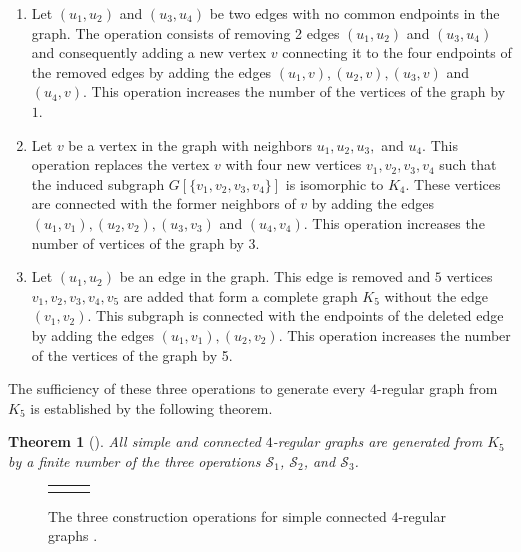 \documentclass{article}
\newtheorem{theorem}{Theorem}
\newcommand{\SI}{
\begin{tikzpicture}
    \node[cvertex] (u1) at (-0.65, 0.5) {}; \node[above=0.15cm]      at (u1) {$u_1$};
    \node[cvertex] (u2) at (0.65, 0.5) {};\node[above=0.15cm]      at (u2) {$u_2$};
    \node[cvertex] (u3) at (-0.65, -0.5) {}; \node[below=0.15cm]      at (u3) {$u_3$};
    \node[cvertex] (u4) at (0.65, -0.5) {};\node[below=0.15cm]      at (u4) {$u_4$};
    
    \draw[redge] (u1) to (u2);
    \draw[redge] (u3) to (u4);
    \draw[gray!60,densely dashed] (0,0) circle (1.3cm);

    \draw[very thick,->] (0,-1.5) -- node[right=0.1cm] {$\mathcal{S}_1$} (0,-2.5);

    \begin{scope}[yshift=-4.3cm]
        \node[cvertex] (u1) at (-0.8, 0.5) {};\node[above=0.15cm]      at (u1) {$u_1$};
        \node[cvertex] (u2) at (0.8, 0.5) {};\node[above=0.15cm]      at (u2) {$u_2$};
        \node[cvertex] (u3) at (-0.8, -0.5) {}; \node[below=0.15cm]      at (u3) {$u_3$};
        \node[cvertex] (u4) at (0.8, -0.5) {}; \node[below=0.15cm]      at (u4) {$u_4$};
        \node[ovvertex] (v) at (0, 0) {}; \node[above=0.15cm]      at (v) {$v$};
        
        \draw[gray!60,densely dashed] (0,0) circle (1.65cm);
        \draw[bedge] (u1) to (v);
        \draw[bedge] (u2) to (v);
        \draw[bedge] (u3) to (v);
        \draw[bedge] (u4) to (v);
    \end{scope}
\end{tikzpicture}
}
\newcommand{\SII}{
\begin{tikzpicture}
    \node[gvertex] (v) at (0, 0) {}; \node[above=0.15cm]      at (v) {$v$};
    \node[cvertex] (u1) at (-0.6, 0.6) {}; \node[above=0.15cm]      at (u1) {$u_1$};
    \node[cvertex] (u2) at (0.6, 0.6) {}; \node[above=0.15cm]      at (u2) {$u_2$};
    \node[cvertex] (u3) at (-0.6, -0.6) {}; \node[below=0.15cm]      at (u3) {$u_3$};
    \node[cvertex] (u4) at (0.6, -0.6) {};  \node[below=0.15cm]      at (u4) {$u_4$};
    
    \draw[redge] (v) to (u1);
    \draw[redge] (v) to (u2);
    \draw[redge] (v) to (u3);
    \draw[redge] (v) to (u4);
    
    \draw[gray!60,densely dashed] (0,0) circle (1.3cm);

    \draw[very thick,->] (0,-1.5) -- node[right=0.1cm] {$\mathcal{S}_2$} (0,-2.5);

    \begin{scope}[yshift=-4.3cm]
        \node[cvertex] (u1) at (-0.85, 0.85) {}; \node[above=0.15cm]      at (u1) {$u_1$};
        \node[cvertex] (u2) at (0.85, 0.85) {}; \node[above=0.15cm]      at (u2) {$u_2$};
        \node[cvertex] (u3) at (-0.85, -0.85) {};  \node[below=0.15cm]      at (u3) {$u_3$};
        \node[cvertex] (u4) at (0.85, -0.85) {};  \node[below=0.15cm]      at (u4) {$u_4$};
        
        \node[ovvertex] (v1) at (-0.35, 0.35) {}; \node[above =0.1cm]      at (v1) {$v_1$};
        \node[ovvertex] (v2) at (0.35, 0.35) {}; \node[above =0.1cm]      at (v2) {$v_2$};
        \node[ovvertex] (v3) at (-0.35, -0.35) {}; \node[below =0.1cm]      at (v3) {$v_3$};
        \node[ovvertex] (v4) at (0.35, -0.35) {}; \node[below =0.1cm]      at (v4) {$v_4$};
        
        \draw[gray!60,densely dashed] (0,0) circle (1.65cm);
        
        \draw[ovedge] (v1) to (v2);
        \draw[ovedge] (v1) to (v3);
        \draw[ovedge] (v1) to (v4);
        \draw[ovedge] (v2) to (v3);
        \draw[ovedge] (v2) to (v4);
        \draw[ovedge] (v3) to (v4);
        
        \draw[bedge] (u1) to (v1);
        \draw[bedge] (u2) to (v2);
        \draw[bedge] (u3) to (v3);
        \draw[bedge] (u4) to (v4);
    \end{scope}
\end{tikzpicture}
}
\newcommand{\SIII}{
\begin{tikzpicture}
    \node[cvertex] (u1) at (-0.6, 0) {}; \node[above=0.15cm]      at (u1) {$u_1$};
    \node[cvertex] (u2) at (0.6, 0) {};  \node[above=0.15cm]      at (u2) {$u_2$};
    
    \draw[redge] (u1) to (u2);
    \draw[gray!60,densely dashed] (0,0) circle (1.3cm);

   \draw[very thick,->] (0,-1.5) -- node[right=0.1cm] {$\mathcal{S}_3$} (0,-2.5);

    \begin{scope}[yshift=-4.3cm]
        \node[cvertex] (u1) at (-1.3, 0) {}; \node[above=0.15cm]      at (u1) {$u_1$};
        \node[cvertex] (u2) at (1.3, 0) {}; \node[above=0.15cm]      at (u2) {$u_2$};
        
        \node[ovvertex] (v1) at (-0.6, 0) {}; \node[above=0.1cm]      at (v1) {$v_1$};
        \node[ovvertex] (v2) at (0.6, 0) {}; \node[above=0.1cm]      at (v2) {$v_2$};
        \node[ovvertex] (v3) at (0, 0.75) {}; \node[above=0.15cm]      at (v3) {$v_3$};
        \node[ovvertex] (v4) at (-0.4, -0.6) {}; \node[below=0.15cm]      at (v4) {$v_4$};
        \node[ovvertex] (v5) at (0.4, -0.6) {}; \node[below=0.15cm]      at (v5) {$v_5$};

        \draw[gray!60,densely dashed] (0,0) circle (1.65cm);

        \draw[ovedge] (v3) to (v1); \draw[ovedge] (v3) to (v2);
        \draw[ovedge] (v3) to (v4); \draw[ovedge] (v3) to (v5);
        \draw[ovedge] (v4) to (v1); \draw[ovedge] (v4) to (v2);
        \draw[ovedge] (v4) to (v5);
        \draw[ovedge] (v5) to (v1); \draw[ovedge] (v5) to (v2);

        \draw[bedge] (u1) to (v1);
        \draw[bedge] (u2) to (v2);
    \end{scope}
\end{tikzpicture}
}
\begin{document}
        \begin{enumerate}
            \item[$\mathcal{S}_1$:] 
            Let $(u_1, u_2)$ and $(u_3, u_4)$ be two  edges with no common endpoints in the graph. 
            The operation consists of removing 2 edges $(u_1, u_2)$ and $(u_3, u_4)$ and consequently adding a new vertex $v$ connecting it to the four endpoints of the removed edges by adding the edges $(u_1,v), (u_2,v), (u_3,v)$ and $(u_4,v)$. 
            This operation increases the number of the vertices of the graph by $1$.
        
            \item[$\mathcal{S}_2$:]  
            Let $v$ be a vertex in the graph with neighbors $u_1, u_2, u_3,$ and $u_4$.
            This operation replaces the vertex $v$ with four new vertices $v_1, v_2, v_3, v_4$ such that the induced subgraph $G[\{v_1,v_2,v_3,v_4\}]$ is isomorphic to $K_4$.
            These vertices are connected with the former neighbors of $v$ by adding the edges $(u_1, v_1),(u_2, v_2),(u_3, v_3)$ and $(u_4, v_4)$. 
            This operation increases the number of vertices of the graph by 3.
            
            \item[$\mathcal{S}_3$:]  
            Let $(u_1,u_2)$ be an edge in the graph. 
            This edge is removed and $5$ vertices $v_1, v_2, v_3, v_4, v_5$ are added that form a complete graph $K_5$ without the edge $(v_1, v_2)$.
            This subgraph is connected with the endpoints of the deleted edge by adding the edges $(u_1, v_1), (u_2, v_2)$.
            This operation increases the number of the vertices of the graph by 5.
        \end{enumerate}
        
        The sufficiency of these three operations to generate every $4$-regular graph from $K_5$ is established by the following theorem.
        
        \begin{theorem}[\cite{Bories1983}]
            All simple and  connected $4$-regular graphs are generated from $K_5$ by a finite number of the three operations $\mathcal{S}_1$, $\mathcal{S}_2$, and $\mathcal{S}_3$.
        \end{theorem}

        \begin{figure}	
            \begin{center}
                \begin{tabular}{ccc}
			
                    \SI \hspace{2mm}	& \hspace{2mm} \SII  & \hspace{2mm} \SIII \\

                \end{tabular} 
            \end{center}
            \caption{The three construction operations for simple connected $4$-regular graphs \cite{Bories1983}.}
            \label{fig:sconstr}
        \end{figure}
\end{document}
